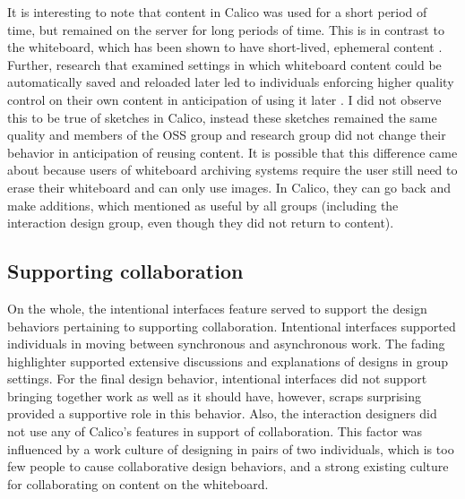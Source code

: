 It is interesting to note that content in Calico was used for a short period of time, but remained on the server for long periods of time. This is in contrast to the whiteboard, which has been shown to have short-lived, ephemeral content \cite{cherubini2007let}. Further, research that examined settings in which whiteboard content could be automatically saved and reloaded later led to individuals enforcing higher quality control on their own content in anticipation of using it later \cite{Branham2010fromwhiteboard}. I did not observe this to be true of sketches in Calico, instead these sketches remained the same quality and members of the OSS group and research group did not change their behavior in anticipation of reusing content. It is possible that this difference came about because users of whiteboard archiving systems require the user still need to erase their whiteboard and can only use images. In Calico, they can go back and make additions, which mentioned as useful by all groups (including the interaction design group, even though they did not return to content).





\subsection{Supporting collaboration}

On the whole, the intentional interfaces feature served to support the design behaviors pertaining to supporting collaboration. Intentional interfaces supported individuals in moving between synchronous and asynchronous work. The fading highlighter supported extensive discussions and explanations of designs in group settings. For the final design behavior, intentional interfaces did not support bringing together work as well as it should have, however, scraps surprising provided a supportive role in this behavior. Also, the interaction designers did not use any of Calico's features in support of collaboration. This factor was influenced by a work culture of designing in pairs of two individuals, which is too few people to cause collaborative design behaviors, and a strong existing culture for collaborating on content on the whiteboard.

